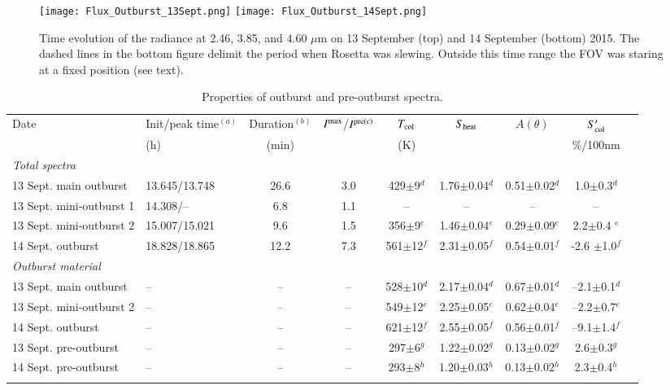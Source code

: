 \documentclass[a4paper,fleqn,usenatbib]{mnras}
\begin{document}
\begin{figure}
    \texttt{[image: Flux\_Outburst\_13Sept.png]}
    \texttt{[image: Flux\_Outburst\_14Sept.png]}
       \caption{Time evolution of the radiance at 2.46, 3.85, and 4.60 $\mu$m on 13 September (top) and 14 September (bottom) 2015. The dashed lines in the bottom figure delimit the period when Rosetta was slewing. Outside this time range the FOV was staring at a fixed position (see text).  }
    \label{fig:lightcurve}
\end{figure}



\begin{table*}
    \caption{Properties of outburst and pre-outburst spectra.}
    \label{tab:properties}
    \begin{tabular}{llccccccc}
        \hline\noalign{\smallskip}
        Date & Init/peak time$^{(a)}$ & Duration$^{(b)}$ & $I^{\rm max}$/$I^{\rm pre (c)}$ & $T_{\rm col}$  & $S_{\rm heat}$ & $A(\theta)$ & $S'_{\rm col}$ \\
        & (h) & (min) & & (K) & & & \%/100nm  \\
        \hline\noalign{\smallskip}
        {\it Total spectra} &&&&&&\\
        13 Sept. main outburst & 13.645/13.748 & 26.6 & 3.0 & 429$\pm$9$^d$ & 1.76$\pm$0.04$^d$  & 0.51$\pm$0.02$^d$ & 1.0$\pm$0.3$^d$ \\
        13 Sept. mini-outburst 1 & 14.308/--&  6.8 & 1.1 & -- & -- & -- & -- \\
        13 Sept. mini-outburst 2 & 15.007/15.021 & 9.6  & 1.5 & 356$\pm$9$^e$ & 1.46$\pm$0.04$^e$ & 0.29$\pm$0.09$^e$& 2.2$\pm$0.4 $^e$ \\
        14 Sept. outburst& 18.828/18.865 & 12.2 & 7.3 & 561$\pm$12$^f$  & 2.31$\pm$0.05$^f$ & 0.54$\pm$0.01$^f$ & -2.6 $\pm$1.0$^f$   \\
        \hline\noalign{\smallskip}
        {\it Outburst material} &&&&&&\\
        13 Sept. main outburst &--&--&--& 528$\pm$10$^d$ & 2.17$\pm$0.04$^d$ &  0.67$\pm$0.01$^d$ & --2.1$\pm$0.1$^d$  \\
        13 Sept. mini-outburst 2 &--&--&--& 549$\pm$12$^e$ & 2.25$\pm$0.05$^e$ &  0.62$\pm$0.04$^e$ & --2.2$\pm$0.7$^e$  \\
        14 Sept.  outburst &--&--&--& 621$\pm$12$^f$ & 2.55$\pm$0.05$^f$ &  0.56$\pm$0.01$^f$ & --9.1$\pm$1.4$^f$  \\
        \hline\noalign{\smallskip}
        13 Sept. pre-outburst & -- & -- & -- & 297$\pm$6$^g$ & 1.22$\pm$0.02$^g$ & 0.13$\pm$0.02$^g$  & 2.6$\pm$0.3$^g$    \\
        14 Sept. pre-outburst & -- & -- & -- &  293$\pm$8$^h$ & 1.20$\pm$0.03$^h$ & 0.13$\pm$0.02$^h$  & 2.3$\pm$0.4$^h$  \\
        \hline        \noalign{\smallskip}
    \end{tabular}


\end{table*}
\end{document}
